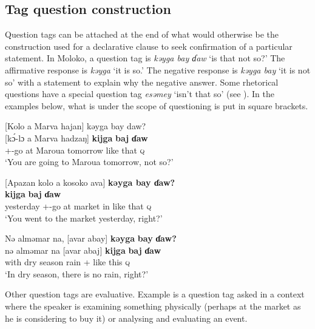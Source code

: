 \subsection{Tag question construction}\label{sec:10.3.3}
\hypertarget{RefHeading1213041525720847}{}
Question tags can be attached at the end of what would otherwise be the construction used for a declarative clause to seek confirmation of a particular statement. In Moloko, a question tag is \textit{kəyga bay ɗaw} ‘is that not so?’ The affirmative response is \textit{kəyga} ‘it is so.' The negative response is \textit{kəyga bay }‘it is not so’ with a statement to explain why the negative answer. Some rhetorical questions have a special question tag \textit{esəmey} ‘isn’t that so’ (see ). In the examples below, what is under the scope of questioning is put in square brackets. 

\ea \label{ex:10:91}
[Kolo  a  Marva  hajan]  kəyga  bay  daw?   \hspace{65pt}      \\
\gll  {}[k\'{ɔ}-lɔ   a   Marva  hadzaŋ]   \textbf{kijga}    \textbf{baj}   \textbf{ɗaw} \hspace{5pt}  \\
      {\twoS}+{\IFV}-go  at  Maroua  tomorrow  {like that}    {\NEG}  {\textsc{q}}  {} \\
\glt  ‘You are going to Maroua tomorrow, not so?’  \hspace{35pt}         
\z 

\ea \label{ex:10:92}
{}[Apazan  kolo  a  kosoko  ava]  \textbf{kəyga  bay  ɗaw?}\\
  \textbf{kijga}  \textbf{baj}  \textbf{ɗaw}\\
      yesterday  {\twoS}+{\PFV}-go  at  market  in  {like that}  {\NEG}  {\textsc{q}}\\
\glt  ‘You went to the market yesterday, right?’
\z 

\ea \label{ex:10:93}
Nə  alməmar  na,  [avar  abay]  \textbf{kəyga}  \textbf{bay}  \textbf{ɗaw?}\\
\gll  nə    alməmar   na  [avar   abaj]     \textbf{kijga}   \textbf{baj}   \textbf{ɗaw}\\
      with      {dry season}  {\PSP}  rain  {\EXT}+{\NEG}  {like this}  {\NEG}  {\textsc{q}}\\ 
\glt  ‘In dry season, there is no rain, right?’  
\z 

Other question tags are evaluative. Example  is a question tag asked in a context where the speaker is examining something physically (perhaps at the market as he is considering to buy it) or analysing and evaluating an event. 

